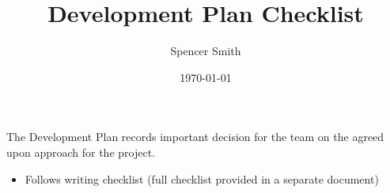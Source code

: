 \documentclass[12pt]{article}
\newcommand{\cmark}{\ding{51}}%
\newcommand{\xmark}{\ding{55}}%
\newcommand{\done}{\rlap{$\square$}{\raisebox{2pt}{\large\hspace{1pt}\cmark}}%
\hspace{-2.5pt}}
\newcommand{\wontfix}{\rlap{$\square$}{\large\hspace{1pt}\xmark}}
\begin{document}
\title{Development Plan Checklist}
\author{Spencer Smith}
\date{\today}

\maketitle


The Development Plan records important decision for the team on the agreed upon
approach for the project.

\begin{itemize}
\item Follows writing checklist (full checklist provided in a separate document)


\end{itemize}
\end{document}
